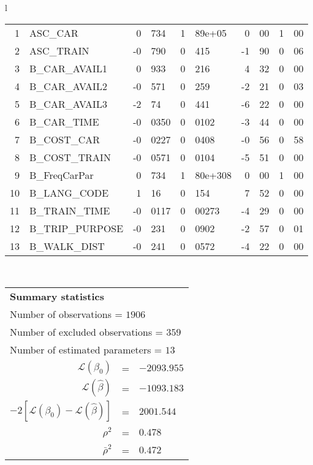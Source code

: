 \begin{tabular}{l}
\begin{tabular}{rlr@{.}lr@{.}lr@{.}lr@{.}l}
1 & ASC_CAR & 0&734 & 1&89e+05 & 0&00 & 1&00\\
2 & ASC_TRAIN & -0&790 & 0&415 & -1&90 & 0&06\\
3 & B_CAR_AVAIL1 & 0&933 & 0&216 & 4&32 & 0&00\\
4 & B_CAR_AVAIL2 & -0&571 & 0&259 & -2&21 & 0&03\\
5 & B_CAR_AVAIL3 & -2&74 & 0&441 & -6&22 & 0&00\\
6 & B_CAR_TIME & -0&0350 & 0&0102 & -3&44 & 0&00\\
7 & B_COST_CAR & -0&0227 & 0&0408 & -0&56 & 0&58\\
8 & B_COST_TRAIN & -0&0571 & 0&0104 & -5&51 & 0&00\\
9 & B_FreqCarPar & 0&734 & 1&80e+308 & 0&00 & 1&00\\
10 & B_LANG_CODE & 1&16 & 0&154 & 7&52 & 0&00\\
11 & B_TRAIN_TIME & -0&0117 & 0&00273 & -4&29 & 0&00\\
12 & B_TRIP_PURPOSE & -0&231 & 0&0902 & -2&57 & 0&01\\
13 & B_WALK_DIST & -0&241 & 0&0572 & -4&22 & 0&00\\
\hline
\end{tabular}
\\
\begin{tabular}{rcl}
\multicolumn{3}{l}{\bf Summary statistics}\\
\multicolumn{3}{l}{ Number of observations = $1906$} \\
\multicolumn{3}{l}{ Number of excluded observations = $359$} \\
\multicolumn{3}{l}{ Number of estimated  parameters = $13$} \\
 $\mathcal{L}(\beta_0)$ &=&  $-2093.955$ \\
 $\mathcal{L}(\hat{\beta})$ &=& $-1093.183 $  \\
 $-2[\mathcal{L}(\beta_0) -\mathcal{L}(\hat{\beta})]$ &=& $2001.544$ \\
    $\rho^2$ &=&   $0.478$ \\
    $\bar{\rho}^2$ &=&    $0.472$ \\
\end{tabular}
  \end{tabular}

